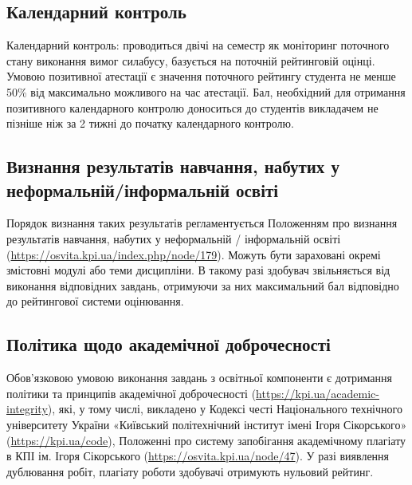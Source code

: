 \documentclass{Syllabus}
\begin{document}
\subsection*{Календарний контроль}

Календарний контроль: проводиться двічі на семестр як моніторинг поточного стану виконання вимог силабусу,  базується на поточній рейтинговій оцінці. Умовою позитивної атестації є значення поточного рейтингу студента не менше 50\% від максимально можливого на час атестації. Бал, необхідний для отримання позитивного календарного контролю доноситься до студентів викладачем не пізніше ніж за 2 тижні до початку календарного контролю.


\subsection*{Визнання  результатів  навчання,  набутих  у  неформальній/інформальній освіті}

Порядок визнання таких результатів регламентується Положенням про визнання результатів навчання, набутих у неформальній / інформальній освіті (\url{https://osvita.kpi.ua/index.php/node/179}).  Можуть бути зараховані окремі змістовні модулі або теми дисципліни. В такому разі здобувач звільняється від виконання відповідних завдань, отримуючи за них максимальний бал відповідно до рейтингової системи оцінювання.


\subsection*{Політика щодо академічної доброчесності}

Обов’язковою умовою виконання завдань з освітньої компоненти є дотримання політики та принципів академічної доброчесності (\url{https://kpi.ua/academic-integrity}), які, у тому числі, викладено у Кодексі честі Національного технічного університету України «Київський політехнічний інститут імені Ігоря Сікорського» (\url{https://kpi.ua/code}), Положенні про систему запобігання академічному плагіату в КПІ ім. Ігоря Сікорського (\url{https://osvita.kpi.ua/node/47}). У разі виявлення дублювання робіт, плагіату роботи здобувачі отримують нульовий рейтинг.
\end{document}
